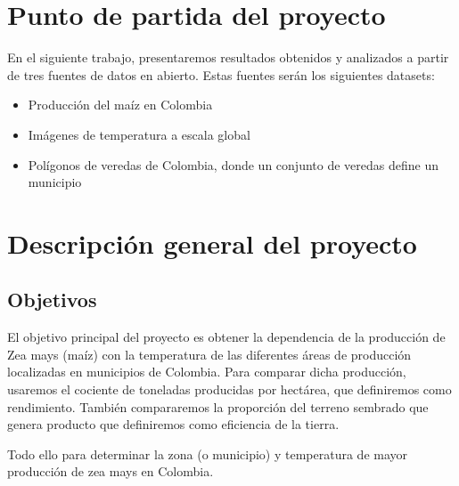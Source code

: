 \documentclass[12pt, spanish]{article}
\begin{document}
\pagestyle{headings}%

\setlength{\parskip}{1em} %





\tableofcontents 
\newpage
{}
\setcounter{page}{1}

\section{Punto de partida del proyecto}

En el siguiente trabajo, presentaremos resultados obtenidos y analizados a partir de tres fuentes de datos en abierto. Estas fuentes serán los siguientes datasets:

\begin{itemize}
    \item Producción del maíz en Colombia \cite{ref1}
    
    \item Imágenes de temperatura a escala global \cite{ref2} 
    
    \item Polígonos de veredas de Colombia, donde un conjunto de veredas define un municipio \cite{ref3}
\end{itemize}


\section{Descripción general del proyecto}

\subsection{Objetivos}

El objetivo principal del proyecto es obtener la dependencia de la producción de Zea mays (maíz) con la temperatura de las diferentes áreas de producción localizadas en municipios de Colombia. Para comparar dicha producción, usaremos el cociente de toneladas producidas por hectárea, que definiremos como rendimiento. También compararemos la proporción del terreno sembrado que genera producto que definiremos como eficiencia de la tierra.

Todo ello para determinar la zona (o municipio) y temperatura de mayor producción de zea mays en Colombia.
\end{document}
